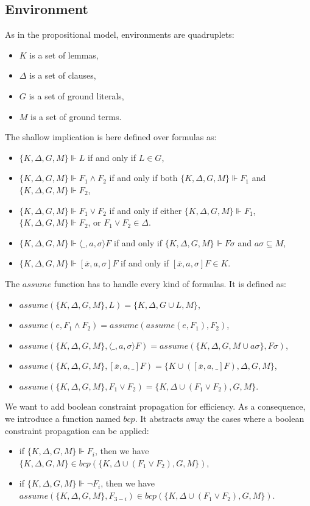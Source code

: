 \documentclass[a4paper,11pt]{article}
\newcommand{\A}{\mathit{assume}}
\newcommand{\B}{\mathit{bcp}}
\begin{document}
\subsection{Environment}
As in the propositional model, environments are quadruplets:
\begin{itemize}
 \item $K$ is a set of lemmas,
 \item $\Delta$ is a set of clauses,
 \item $G$ is a set of ground literals,
 \item $M$ is a set of ground terms.
\end{itemize}
The shallow implication is here defined over formulas as:
\begin{itemize}
 \item $\{K,\Delta,G,M\}\Vdash L$ if and only if $L\in G$,
 \item $\{K,\Delta,G,M\}\Vdash F_1\wedge F_2$ if and only if both $\{K,\Delta,G,M\}\Vdash F_1$
and $\{K,\Delta,G,M\}\Vdash F_2$,
 \item $\{K,\Delta,G,M\}\Vdash F_1\vee F_2$ if and only if either
$\{K,\Delta,G,M\}\Vdash F_1$, $\{K,\Delta,G,M\}\Vdash F_2$, or $F_1\vee F_2\in\Delta$.
 \item $\{K,\Delta,G,M\}\Vdash\langle\_,a,\sigma\rangle F$ if and only if $\{K,\Delta,G,M\}\Vdash F\sigma$
and $a\sigma\subseteq M$,
 \item $\{K,\Delta,G,M\}\Vdash[\overline x,a,\sigma]F$ if and only if $[\overline x,a,\sigma]F\in K$.
\end{itemize}
The $\A$ function has to handle every kind of formulas. It is defined as:
\begin{itemize}
 \item $\A(\{K,\Delta,G,M\},L)=\{K,\Delta,G\cup L,M\}$,
 \item $\A(e,F_1\wedge F_2)=\A(\A(e,F_1),F_2)$,
 \item $\A(\{K,\Delta,G,M\},\langle\_,a,\sigma\rangle F)=
\A(\{K,\Delta,G,M\cup a\sigma\},F\sigma)$,
 \item $\A(\{K,\Delta,G,M\},[\overline x,a,\_]F)=\{K\cup([\overline x,a,\_]F),\Delta,G,M\}$,
 \item $\A(\{K,\Delta,G,M\},F_1\vee F_2)=\{K,\Delta\cup(F_1\vee F_2),G,M\}$.
\end{itemize}
We want to add boolean constraint propagation for efficiency. As a consequence, we introduce a function named $\B$.
It abstracts away the cases where a boolean constraint propagation can be applied:
\begin{itemize}
 \item if $\{K,\Delta,G,M\}\Vdash F_i$, then we have $\{K,\Delta,G,M\}\in\B(\{K,\Delta\cup(F_1\vee F_2),G,M\})$,
 \item if $\{K,\Delta,G,M\}\Vdash\neg F_i$, then we have $\A(\{K,\Delta,G,M\},F_{3-i})\in
\B(\{K,\Delta\cup(F_1\vee F_2),G,M\})$.
\end{itemize}
\end{document}
